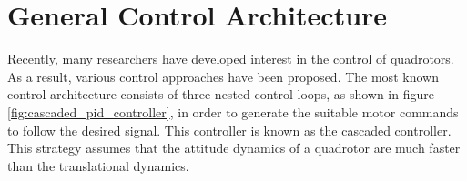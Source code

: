 \documentclass{thesisreport}
\begin{document}
\section{General Control Architecture}
 Recently, many researchers have developed interest in the control of quadrotors. As a result, various control approaches have been proposed. The most known control architecture \cite{Faessler2018} consists of three nested control loops, as shown in figure \ref{fig:cascaded_pid_controller}, in order to generate the suitable motor commands to follow the desired signal. This controller is known as the cascaded controller. This strategy assumes that the attitude dynamics of a quadrotor are much faster than the translational dynamics. 

\end{document}

